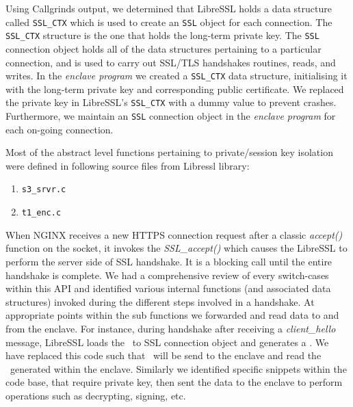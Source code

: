 \documentclass[../main.tex]{subfiles}
\begin{document}
Using Callgrinds output, we determined that LibreSSL holds a data
structure called \texttt{SSL\_CTX} which is used to create an
\texttt{SSL} object for each connection. The \texttt{SSL_CTX}
structure is the one that holds the long-term private key. The
\texttt{SSL} connection object holds all of the data structures
pertaining to a particular connection, and is used to carry out
SSL/TLS handshakes routines, reads, and writes. In the \textit{enclave
  program} we created a \texttt{SSL\_CTX} data structure, initialising
it with the long-term private key and corresponding public
certificate. We replaced the private key in LibreSSL's
\texttt{SSL_CTX} with a dummy value to prevent crashes. Furthermore,
we maintain an \texttt{SSL} connection object in the \textit{enclave
  program} for each on-going connection.
 
Most of the abstract level functions pertaining to private/session key
isolation were defined in following source files from Libressl
library:
\begin{enumerate}
  \item \texttt{s3\_srvr.c}
  \item \texttt{t1\_enc.c}
\end{enumerate}
 
When NGINX receives a new HTTPS connection request after a classic
\textit{accept()} function on the socket, it invokes the
\textit{SSL\_accept()} which causes the LibreSSL to perform the server
side of SSL handshake. It is a blocking call until the entire
handshake is complete. We had a comprehensive review of every
switch-cases within this API and identified various internal functions
(and associated data structures) invoked during the different steps
involved in a handshake. At appropriate points within the sub
functions we forwarded and read data to and from the enclave. For
instance, during handshake after receiving a \textit{client\_hello}
message, LibreSSL loads the \crandom~to SSL connection object and
generates a \srandom. We have replaced this code such that
\crandom~will be send to the enclave and read the \srandom~generated
within the enclave. Similarly we identified specific snippets within
the code base, that require private key, then sent the data to the
enclave to perform operations such as decrypting, signing, etc.
\end{document}
